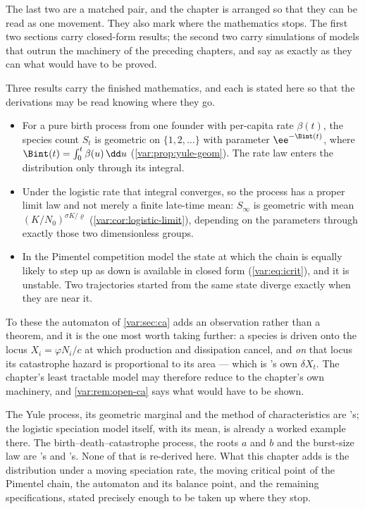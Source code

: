 The last two are a matched pair, and the chapter is arranged so that they can
be read as one movement. They also mark where the mathematics stops. The
first two sections carry closed-form results; the second two carry
simulations of models that outrun the machinery of the preceding chapters,
and say as exactly as they can what would have to be proved.

Three results carry the finished mathematics, and each is stated here so that
the derivations may be read knowing where they go.

\begin{itemize}[leftmargin=1.6em,itemsep=0.35em,topsep=0.35em]
\item For a pure birth process from one founder with per-capita rate
$\beta(t)$, the species count $S_t$ is geometric on $\{1,2,\dots\}$ with
parameter $\ee^{-\Bint(t)}$, where $\Bint(t)=\int_0^t\beta(u)\,\dd u$
(\cref{var:prop:yule-geom}). The rate law enters the distribution only
through its integral.
\item Under the logistic rate that integral converges, so the process has a
proper limit law and not merely a finite late-time mean: $S_\infty$ is
geometric with mean $(K/N_0)^{\sigma K/\varrho}$
(\cref{var:cor:logistic-limit}), depending on the parameters through exactly
those two dimensionless groups.
\item In the Pimentel competition model the state at which the chain is
equally likely to step up as down is available in closed form
(\cref{var:eq:icrit}), and it is unstable. Two trajectories started from the
same state diverge exactly when they are near it.
\end{itemize}

To these the automaton of \cref{var:sec:ca} adds an observation rather than a
theorem, and it is the one most worth taking further: a species is driven
onto the locus $X_i=\varphi N_i/c$ at which production and dissipation
cancel, and \emph{on} that locus its catastrophe hazard is proportional to
its area --- which is \ChCore{}'s own $\delta X_t$. The chapter's least
tractable model may therefore reduce to the chapter's own machinery, and
\cref{var:rem:open-ca} says what would have to be shown.

The Yule process, its geometric marginal and the method of characteristics
are \ChM{}'s; the logistic speciation model itself, with its mean, is already
a worked example there. The birth--death--catastrophe process, the roots $a$
and $b$ and the burst-size law are \ChCore{}'s and \ChDist{}'s. None of that
is re-derived here. What this chapter adds is the distribution under a moving
speciation rate, the moving critical point of the Pimentel chain, the
automaton and its balance point, and the remaining specifications, stated
precisely enough to be taken up where they stop.

